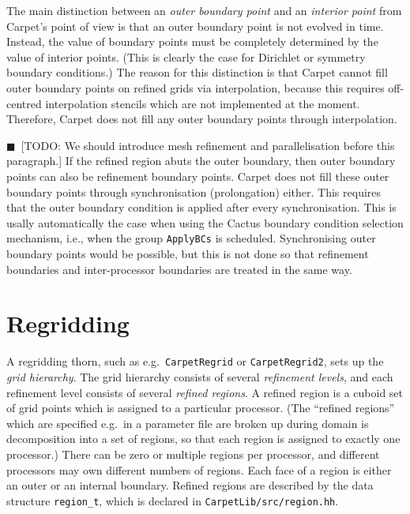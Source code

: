 \documentclass[oneside]{amsart}
\newcommand{\todo}[1]{{\color{blue}$\blacksquare$~\textsf{[TODO: #1]}}}
\newcommand{\code}[1]{\texttt{#1}}
\begin{document}
The main distinction between an \emph{outer boundary point} and an
\emph{interior point} from Carpet's point of view is that an outer
boundary point is not evolved in time.  Instead, the value of boundary
points must be completely determined by the value of interior points.
(This is clearly the case for Dirichlet or symmetry boundary
conditions.)  The reason for this distinction is that Carpet cannot
fill outer boundary points on refined grids via interpolation, because
this requires off-centred interpolation stencils which are not
implemented at the moment.  Therefore, Carpet does not fill any outer
boundary points through interpolation.

\todo{We should introduce mesh refinement and parallelisation before
  this paragraph.}
%
If the refined region abuts the outer boundary, then outer boundary
points can also be refinement boundary points.  Carpet does not fill
these outer boundary points through synchronisation (prolongation)
either.  This requires that the outer boundary condition is applied
after every synchronisation.  This is usally automatically the case
when using the Cactus boundary condition selection mechanism, i.e.,
when the group \texttt{ApplyBCs} is scheduled.  Synchronising outer
boundary points would be possible, but this is not done so that
refinement boundaries and inter-processor boundaries are treated in
the same way.



\section{Regridding}

A regridding thorn, such as e.g.\ \texttt{CarpetRegrid} or
\texttt{CarpetRegrid2}, sets up the \emph{grid hierarchy}.  The grid
hierarchy consists of several \emph{refinement levels}, and each
refinement level consists of several \emph{refined regions}.  A
refined region is a cuboid set of grid points which is assigned to a
particular processor.  (The ``refined regions'' which are specified
e.g.\ in a parameter file are broken up during domain is decomposition
into a set of regions, so that each region is assigned to exactly one
processor.)  There can be zero or multiple regions per processor, and
different processors may own different numbers of regions.  Each face
of a region is either an outer or an internal boundary.  Refined
regions are described by the data structure \code{region\_t}, which is
declared in \code{CarpetLib/src/region.hh}.
\end{document}
